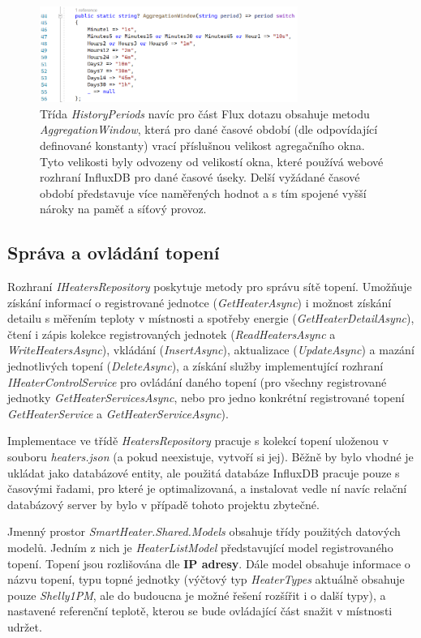 \begin{figure}[hbt]
\includegraphics[width=0.75\textwidth]{obrazky-figures/code-aggregationwindow.png}
\caption{Třída {\it HistoryPeriods} navíc pro část Flux dotazu obsahuje metodu {\it AggregationWindow}, která pro dané časové období (dle odpovídající definované konstanty) vrací příslušnou velikost agregačního okna. Tyto velikosti byly odvozeny od velikostí okna, které používá webové rozhraní InfluxDB pro dané časové úseky. Delší vyžádané časové období představuje více naměřených hodnot a s tím spojené vyšší nároky na paměť a síťový provoz.}
\end{figure}


\subsection{Správa a ovládání topení}
Rozhraní {\it IHeatersRepository} poskytuje metody pro správu sítě topení. Umožňuje získání informací o registrované jednotce ({\it GetHeaterAsync}) i možnost získání detailu s měřením teploty v místnosti a spotřeby energie ({\it GetHeaterDetailAsync}), čtení i zápis kolekce registrovaných jednotek ({\it ReadHeatersAsync} a {\it WriteHeatersAsync}), vkládání ({\it InsertAsync}), aktualizace ({\it UpdateAsync}) a mazání jednotlivých topení ({\it DeleteAsync}), a získání služby implementující rozhraní {\it IHeaterControlService} pro ovládání daného topení (pro všechny registrované jednotky {\it GetHeaterServicesAsync}, nebo pro jedno konkrétní registrované topení {\it GetHeaterService} a {\it GetHeaterServiceAsync}).
 
Implementace ve třídě {\it HeatersRepository} pracuje s kolekcí topení uloženou v souboru {\it heaters.json} (a pokud neexistuje, vytvoří si jej). Běžně by bylo vhodné je ukládat jako databázové entity, ale použitá databáze InfluxDB pracuje pouze s časovými řadami, pro které je optimalizovaná, a instalovat vedle ní navíc relační databázový server by bylo v případě tohoto projektu zbytečné.

Jmenný prostor {\it SmartHeater.Shared.Models} obsahuje třídy použitých datových modelů. Jedním z nich je {\it HeaterListModel} představující model registrovaného topení. Topení jsou rozlišována dle \textbf{IP adresy}. Dále model obsahuje informace o názvu topení, typu topné jednotky (výčtový typ {\it HeaterTypes} aktuálně obsahuje pouze {\it Shelly1PM}, ale do budoucna je možné řešení rozšířit i o další typy), a nastavené referenční teplotě, kterou se bude ovládající část snažit v místnosti udržet.

